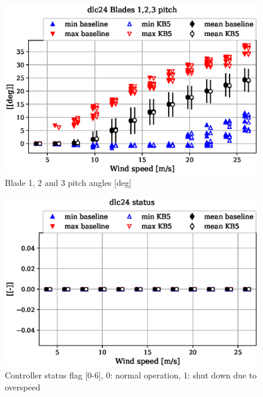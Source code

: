 \begin{figure}[!ht]
\begin{center}
	\includegraphics[width=.85\linewidth]{figures/baseline-vs-KB6/dlc24/bearing-pitch1-angle-deg_AA0007_AA0003.eps}
\end{center}
\caption{Blade 1, 2 and 3 pitch angles [deg]}
\label{fig:baseline-vs-KB6:dlc24:pitch}
\end{figure}

\begin{figure}[!ht]
\begin{center}
	\includegraphics[width=.85\linewidth]{figures/baseline-vs-KB6/dlc24/DLL-dtu_we_controller-inpvec-22_AA0007_AA0003.eps}
\end{center}
\caption{Controller status flag [0-6], 0: normal operation, 1: shut down due to overspeed}
\label{fig:baseline-vs-KB6:dlc24:status}
\end{figure}

